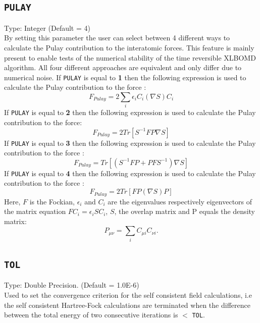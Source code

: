 \documentclass[a4paper,twoside,openany]{book}
\begin{document}
 \subsection{\texttt{PULAY}}
 Type: Integer (Default = 4)\\
 By setting this parameter the user can select between 4 different ways to calculate the Pulay contribution to the interatomic forces. This feature is mainly present 
 to enable  tests  of the numerical stability of the time reversible XLBOMD algorithm. All four different approaches are equivalent and only differ due to numerical 
 noise. If  \texttt{PULAY} is equal to {\bf1} then the following expression is used to calculate the Pulay contribution to the force \cite{f1}:
 \begin{equation}
 F_{Pulay} = 2\sum_{i}\epsilon_{i}C_{i}(\nabla S)C_{i}
 \end{equation}
 If  \texttt{PULAY}  is equal to {\bf2} then the following expression is used to calculate the Pulay contribution to the force:
 \begin{equation}
 F_{Pulay} = 2Tr[ S^{-1}FP\nabla S]
 \end{equation}
  If  \texttt{PULAY}  is equal to {\bf3} then the following expression is used to calculate the Pulay contribution to the force \cite{AMN2}:
   \begin{equation} 
    F_{Pulay} = Tr[  ( S^{-1}FP +  PFS^{-1} )\nabla S]
 \end{equation}
  If  \texttt{PULAY}  is equal to {\bf4} then the following expression is used to calculate the Pulay contribution to the force \cite{f2}:
 \begin{equation}
 F_{Pulay} = 2Tr[ FP(\nabla S)P]
 \end{equation}
 Here, $F$ is the Fockian, $\epsilon_{i}$ and $C_{i}$ are the eigenvalues respectively eigenvectors of the matrix equation $FC_{i}=\epsilon_{i}SC_{i}$, 
 $S$, the overlap matrix and P equals the density matrix:
  \begin{equation}
 P_{\mu\nu} = \sum_{i} C_{\mu i}C_{\nu i}.
  \end{equation}
\subsection{\texttt{TOL}}
Type: Double Precision. (Default = 1.0E-6)\\
Used to set the convergence criterion for the self consistent field calculations, i.e the self consistent Hartree-Fock calculations are terminated when the difference between the total energy 
of two consecutive iterations is  $<$ \texttt{TOL}.
\end{document}
